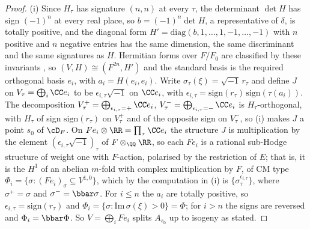 \begin{proof}
(i) Since $H_{\tau}$ has signature $(n,n)$ at every $\tau$, the determinant
$\det H$ has sign $(-1)^{n}$ at every real place, so $b=(-1)^{n}\det H$, a
representative of $\delta$, is totally positive, and the diagonal form $H'=\mathrm{diag}(b,1,\dots,1,-1,\dots,-1)$
with $n$ positive and $n$ negative entries has the same dimension, the same
discriminant and the same signatures as $H$. Hermitian forms over $F/F_{0}$
are classified by these invariants \cite[Ch.~10, \S6]{Sch85}, so
$(V,H)\cong(F^{2n},H')$ and the standard basis is the required orthogonal
basis $e_{i}$, with $a_{i}=H(e_{i},e_{i})$. Write $\sigma_{\tau}(\xi)=\sqrt{-1}\,r_{\tau}$
and define $J$ on $V_{\tau}=\bigoplus_{i}\CC e_{i}$ to be
$\epsilon_{i,\tau}\sqrt{-1}$ on $\CC e_{i}$, with
$\epsilon_{i,\tau}=\mathrm{sign}(r_{\tau})\,\mathrm{sign}(\tau(a_{i}))$. The
decomposition $V_{\tau}^{+}=\bigoplus_{\epsilon_{i,\tau}=+}\CC e_{i}$,
$V_{\tau}^{-}=\bigoplus_{\epsilon_{i,\tau}=-}\CC e_{i}$ is $H_{\tau}$-orthogonal,
with $H_{\tau}$ of sign $\mathrm{sign}(r_{\tau})$ on $V_{\tau}^{+}$ and of the
opposite sign on $V_{\tau}^{-}$, so (i) makes $J$ a point
$s_{0}$ of $\cD_{F}$. On $Fe_{i}\otimes\RR=\prod_{\tau}\CC e_{i}$ the
structure $J$ is multiplication by the element
$(\epsilon_{i,\tau}\sqrt{-1})_{\tau}$ of $F\otimes_{\QQ}\RR$, so each $Fe_{i}$
is a rational sub-Hodge structure of weight one with $F$-action, polarised by
the restriction of $E$; that is, it is the $H^{1}$ of an abelian $m$-fold with
complex multiplication by $F$, of CM type
$\Phi_{i}=\{\sigma:(Fe_{i})_{\sigma}\subseteq V^{1,0}\}$, which by the
computation in (i) is
$\{\sigma_{\tau}^{\epsilon_{i,\tau}}\}$, where $\sigma^{+}=\sigma$ and
$\sigma^{-}=\bbar\sigma$. For $i\le n$ the $a_{i}$ are totally positive, so
$\epsilon_{i,\tau}=\mathrm{sign}(r_{\tau})$ and
$\Phi_{i}=\{\sigma:\mathrm{Im}\,\sigma(\xi)>0\}=\Phi$; for $i>n$ the signs are
reversed and $\Phi_{i}=\bbar\Phi$. So $V=\bigoplus_{i}Fe_{i}$ splits
$A_{s_{0}}$ up to isogeny as stated.


\end{proof}

